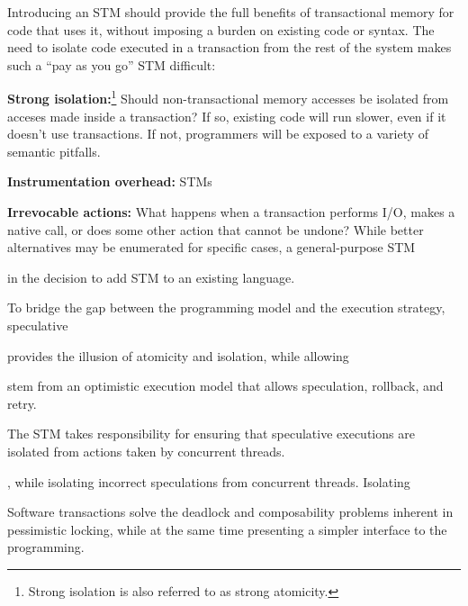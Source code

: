Introducing
an STM should provide the full benefits of transactional memory for
code that uses it, without imposing a burden on existing code or syntax.
The need to isolate code executed in a transaction from the rest of the system
makes such a ``pay as you go'' STM difficult:
\begin{packed_itemize}

\item \textbf{Strong isolation:}\footnote{Strong isolation is also 
referred to as strong atomicity.} Should non-transactional memory accesses be isolated from
acceses made inside a transaction?  If so, existing code will run slower, even
if it doesn't use transactions.  If not, programmers will be exposed to a
variety of semantic pitfalls.

\item \textbf{Instrumentation overhead:} STMs 

\item \textbf{Irrevocable actions:} What happens when a transaction performs
I/O, makes a native call, or does some other action that cannot be undone?
While better alternatives may be enumerated for specific cases, a
general-purpose STM 

\item 

\end{packed_itemize}

in the decision to add STM to an existing language.


To bridge the gap between the programming model and the execution
strategy, speculative 

provides the illusion of
atomicity and isolation, while allowing 


stem from an optimistic execution model that allows speculation, rollback,
and retry.  

The STM takes responsibility for ensuring that speculative
executions are isolated from actions taken by concurrent threads.

, while isolating incorrect speculations from concurrent threads.
Isolating 

Software transactions
solve the deadlock and composability problems inherent in pessimistic
locking, while at the same time presenting a simpler interface to the
programming.
